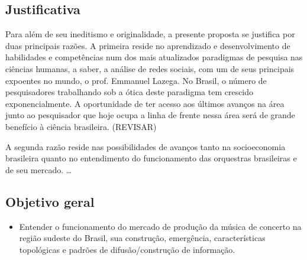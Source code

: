 \documentclass[a4paper, 12pt, openright, oneside, german, french, english, brazil]{abntex2}
\begin{document}
	
	
	
	
	
	
	
	\subsection*{Justificativa}
	
	
	Para além de seu ineditismo e originalidade, a presente proposta se justifica por duas principais razões. A primeira reside no aprendizado e desenvolvimento de habilidades e competências num dos mais atualizados paradigmas de pesquisa nas ciências humanas, a saber, a análise de redes sociais, com um de seus principais expoentes no mundo, o prof. Emmanuel Lazega. No Brasil, o número de pesquisadores trabalhando sob a ótica deste paradigma tem crescido exponencialmente. A oportunidade de ter acesso aos últimos avanços na área junto ao pesquisador que hoje ocupa a linha de frente nessa área será de grande benefício à ciência brasileira. (REVISAR)
	
	A segunda razão reside nas possibilidades de avanços tanto na socioeconomia brasileira quanto no entendimento do funcionamento das orquestras brasileiras e de seu mercado. \ldots
	
	
	
	
	
	
	
	\subsection*{Objetivo geral}
	
	
	\begin{itemize}
		\item Entender o funcionamento do mercado de produção da música de concerto na região sudeste do Brasil, sua construção, emergência, características topológicas e padrões de difusão/construção de informação.
	\end{itemize}
	
\end{document}
